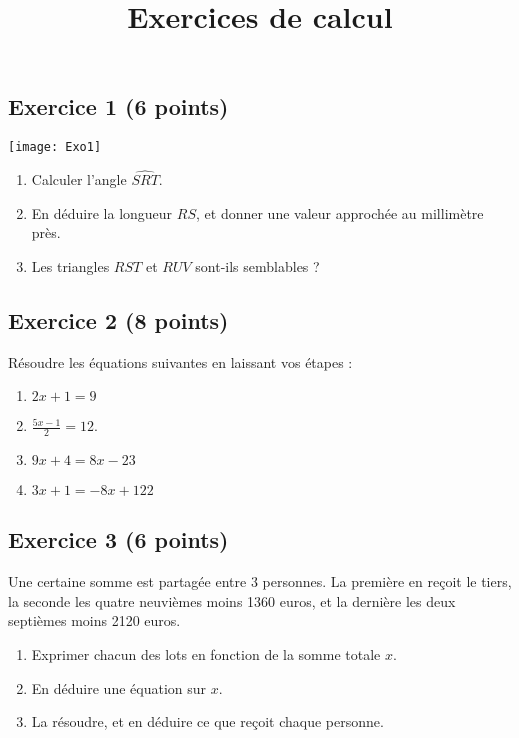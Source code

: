 \documentclass[14 pt, fleqn, pstricks]{extarticle}
\title{Exercices de calcul}
\date{}
\theoremstyle{plain}
\begin{document}
	 


\subsection*{Exercice 1 (6 points) }	 
	 
	 \texttt{[image: Exo1]}
\begin{enumerate}
\item Calculer l'angle $\widehat{SRT}$. 
\item En déduire la longueur $RS$, et donner une valeur approchée au millimètre près. 
\item Les triangles $RST$ et $RUV$ sont-ils semblables ?
\end{enumerate}
\subsection*{Exercice 2 (8 points)}

Résoudre les équations suivantes en laissant vos étapes : 
\begin{enumerate}
\item $2x + 1 = 9$ 
\item $ \frac{5 x - 1}2 = 12$. 
\item $ 9 x + 4  = 8 x - 23$
\item $ 3x + 1 = -8 x +122$ 
\end{enumerate}

\subsection*{Exercice 3 (6 points)}
Une certaine somme est partagée entre $3$ personnes. La première en reçoit le tiers, la seconde les quatre neuvièmes moins 1360 euros, et la dernière les deux septièmes moins 2120 euros. 
\begin{enumerate}
\item Exprimer chacun des lots en fonction de la somme totale $x$. 
\item En déduire une équation sur $x$. 
\item La résoudre, et en déduire ce que reçoit chaque personne. 
\end{enumerate}
 	
\end{document}
